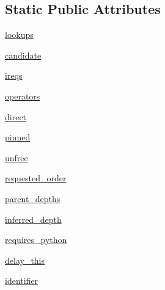 \subsection*{Static Public Attributes}
\begin{DoxyCompactItemize}
\item 
\hyperlink{classpip_1_1__internal_1_1resolution_1_1resolvelib_1_1provider_1_1PipProvider_a66584c1158cb3888fdf46bb18675a236}{lookups}
\item 
\hyperlink{classpip_1_1__internal_1_1resolution_1_1resolvelib_1_1provider_1_1PipProvider_ae2a9c9a790c0a3640a2e94e41161334a}{candidate}
\item 
\hyperlink{classpip_1_1__internal_1_1resolution_1_1resolvelib_1_1provider_1_1PipProvider_a05a3fa9669b48e6d0a1e98f67c555de0}{ireqs}
\item 
\hyperlink{classpip_1_1__internal_1_1resolution_1_1resolvelib_1_1provider_1_1PipProvider_af9ab77eef052319e584fae016ee1692c}{operators}
\item 
\hyperlink{classpip_1_1__internal_1_1resolution_1_1resolvelib_1_1provider_1_1PipProvider_a099fc3fd8946b27d581414f8649dca8f}{direct}
\item 
\hyperlink{classpip_1_1__internal_1_1resolution_1_1resolvelib_1_1provider_1_1PipProvider_a1712a019969b41facaa35933e0899085}{pinned}
\item 
\hyperlink{classpip_1_1__internal_1_1resolution_1_1resolvelib_1_1provider_1_1PipProvider_a88e087c32e972ae65277726395f14ebc}{unfree}
\item 
\hyperlink{classpip_1_1__internal_1_1resolution_1_1resolvelib_1_1provider_1_1PipProvider_a2b1ec741f0edb7be242256b35d685057}{requested\+\_\+order}
\item 
\hyperlink{classpip_1_1__internal_1_1resolution_1_1resolvelib_1_1provider_1_1PipProvider_a9701dc4addd855f297c8a35ad2cfcab2}{parent\+\_\+depths}
\item 
\hyperlink{classpip_1_1__internal_1_1resolution_1_1resolvelib_1_1provider_1_1PipProvider_ac9971208742c03b453f3faa80e401a22}{inferred\+\_\+depth}
\item 
\hyperlink{classpip_1_1__internal_1_1resolution_1_1resolvelib_1_1provider_1_1PipProvider_a6ee9a42186271ddde7a9dc49f9edd00e}{requires\+\_\+python}
\item 
\hyperlink{classpip_1_1__internal_1_1resolution_1_1resolvelib_1_1provider_1_1PipProvider_a1cc2834221f5ce72e5aa6b6238355f1a}{delay\+\_\+this}
\item 
\hyperlink{classpip_1_1__internal_1_1resolution_1_1resolvelib_1_1provider_1_1PipProvider_a5b4d9d8577eaed0f79ac6c1006166efe}{identifier}

\end{DoxyCompactItemize}
